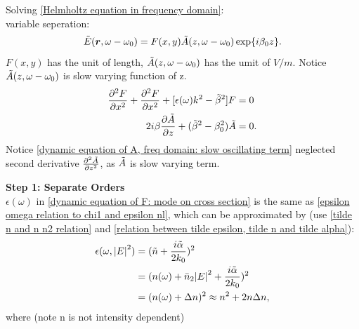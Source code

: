 \documentclass[12pt]{extarticle}
\numberwithin{equation}{section}
\numberwithin{figure}{section}
\numberwithin{table}{section}
\newcommand{\<}{\langle}
\renewcommand{\>}{\rangle}
\theoremstyle{definition}
\newcommand{\SubItem}[1]{
    {\setlength\itemindent{15pt} \item[-] #1}
}
\begin{document}
\begin{itemize}
            \item Solving \autoref{Helmholtz equation in frequency domain}:\\
            variable seperation:
            \begin{equation}
                \Tilde{E}(\boldsymbol{r},\omega-\omega_0)=F(x,y)\Tilde{A}(z,\omega-\omega_0)\exp{i\beta_0 z}.
                \label{tilde E seperate to F, A and exp(ibeta z)}
            \end{equation}
            $F(x,y)$ has the unit of length, $\Tilde{A}(z,\omega-\omega_0)$ has the umit of $V/m$. Notice $\Tilde{A}(z,\omega-\omega_0)$ is slow varying function of z. 
            \begin{subequations}
            \begin{align}
                \pdv[2]{F}{x}+\pdv[2]{F}{x}+[\epsilon(\omega)k^2-\Tilde{\beta}^2]F &= 0 \label{dynamic equation of F: mode on cross section}\\
                2i\beta\pdv{\Tilde{A}}{z}+(\Tilde{\beta}^2-\beta_0^2)\Tilde{A}&=0 \label{dynamic equation of A, freq domain: slow oscillating term}.
            \end{align}
            \end{subequations}
            Notice \autoref{dynamic equation of A, freq domain: slow oscillating term} neglected second derivative $\pdv[2]{\Tilde{A}}{z}$, as $\Tilde{A}$ is slow varying term.\\
            \SubItem{\textbf{Step 1: Separate Orders}\\
                $\epsilon(\omega)$ in \autoref{dynamic equation of F: mode on cross section} is the same as \autoref{epsilon omega relation to chi1 and epsilon nl}, which can be approximated by (use \autoref{tilde n and n n2 relation} and \autoref{relation between tilde epsilon, tilde n and tilde alpha}):
                \begin{equation}
                \begin{split}
                    \epsilon(\omega, \abs{E}^2) &= (\Tilde{n}+\frac{i\Tilde{\alpha}}{2k_0})^2\\
                    &=(n(\omega)+\Bar{n}_2\abs{E}^2+\frac{i\Tilde{\alpha}}{2k_0})^2\\
                    &=(n(\omega)+\Delta n)^2 \approx n^2+2n\Delta n,
                \end{split}
                \end{equation}
                where (note n is not intensity dependent)
                \begin{equation}

\end{equation}}
\end{itemize}
\end{document}
